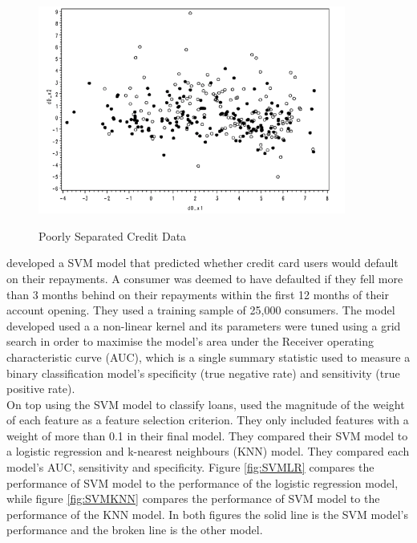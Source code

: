 \begin{figure}[!htb]
\centering
\includegraphics[width = 0.9\textwidth]{images/SVM.png}
\caption{Poorly Separated Credit Data}
\parencite{SVMCrook}
\label{fig:SVM}
\end{figure}

\vspace{15pt}


\textcite{SVMCrook} developed a SVM model that predicted whether credit card users would default on their repayments. A consumer was deemed to have defaulted if they fell more than 3 months behind on their repayments within the first 12 months of their account opening. They used a training sample of 25,000 consumers. The model developed used a a non-linear kernel and its parameters were tuned using a grid search in order to maximise the model's area under the Receiver operating characteristic curve (AUC), which is a single summary statistic used to measure a binary classification model's specificity (true negative rate) and sensitivity (true positive rate). \\

On top using the SVM model to classify loans, \textcite{SVMCrook} used the magnitude of the weight of each feature as a feature selection criterion. They only included features with a weight of more than 0.1 in their final model. They compared their SVM model to a logistic regression and k-nearest neighbours (KNN) model. They compared each model's AUC, sensitivity and specificity. Figure \ref{fig:SVMLR} compares the performance of SVM model to the performance of the logistic regression model, while figure \ref{fig:SVMKNN} compares the performance of SVM model to the performance of the KNN model. In both figures the solid line is the SVM model's performance and the broken line is the other model. \\

